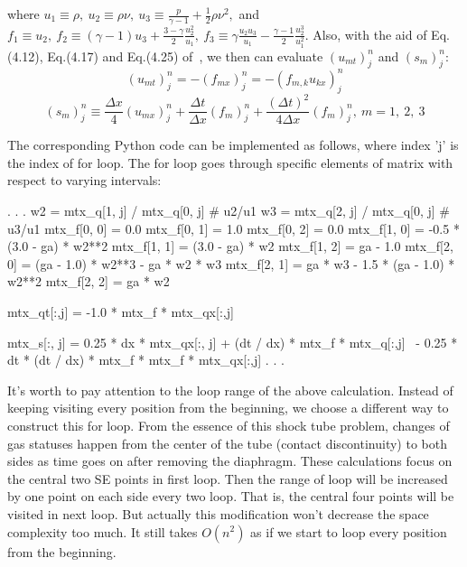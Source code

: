 \documentclass[a4paper,12pt,dvips]{article}
\begin{document}
where $u_{1}\equiv\rho,~u_{2}\equiv\rho\nu,~u_{3}\equiv\frac{p}{\gamma -1}
+\frac{1}{2}\rho\nu^{2},$ \newline
and $f_{1}\equiv u_{2},~f_{2}\equiv(\gamma -1)u_{3}+\frac{3-\gamma}{2}
\frac{u^{2}_{2}}{u_{1}},~f_{3}\equiv\gamma\frac{u_{2}u_{3}}{u_{1}}
-\frac{\gamma -1}{2}\frac{u^{3}_{2}}{u^{2}_{1}}$. \newline
Also, with the aid of Eq.(4.12), Eq.(4.17) and Eq.(4.25)
of~\cite{CESE_Shin_Chung_Chang_1995}, we then can evaluate $(u_{mt})^{n}_{j}$
and $(s_{m})^{n}_{j}$:
\begin{equation}
(u_{mt})^{n}_{j} = -(f_{mx})^{n}_{j} = -(f_{m,k}u_{kx})^{n}_{j}
\end{equation}
\begin{equation}
(s_{m})^{n}_{j}\equiv\frac{\Delta x}{4}(u_{mx})^{n}_{j}+\frac{\Delta t}
{\Delta x}(f_{m})^{n}_{j}+\frac{(\Delta t)^{2}}{4\Delta x}(f_{m})^{n}_{j}
,~m=1,~2,~3
\end{equation}

The corresponding Python code can be implemented as follows, where index 'j' is 
the index of for loop. The for loop goes through specific elements of matrix 
with respect to varying intervals:
\begin{pythonNoIndex}
                            .
                            .
                            .
        w2 = mtx_q[1, j] / mtx_q[0, j]  # u2/u1
        w3 = mtx_q[2, j] / mtx_q[0, j]  # u3/u1
        mtx_f[0, 0] = 0.0
        mtx_f[0, 1] = 1.0
        mtx_f[0, 2] = 0.0
        mtx_f[1, 0] = -0.5 * (3.0 - ga) * w2**2
        mtx_f[1, 1] = (3.0 - ga) * w2
        mtx_f[1, 2] = ga - 1.0
        mtx_f[2, 0] = (ga - 1.0) * w2**3 - ga * w2 * w3
        mtx_f[2, 1] = ga * w3 - 1.5 * (ga - 1.0) * w2**2
        mtx_f[2, 2] = ga * w2

        mtx_qt[:,j] = -1.0 * mtx_f * mtx_qx[:,j]

        mtx_s[:, j] = 0.25 * dx * mtx_qx[:, j] + (dt / dx) * mtx_f * mtx_q[:,j] \
                          - 0.25 * dt * (dt / dx) * mtx_f * mtx_f * mtx_qx[:,j]
                            .
                            .
                            .
\end{pythonNoIndex}

It's worth to pay attention to the loop range of the above calculation.
Instead of keeping visiting every position from the beginning, we choose a
different way to construct this for loop. From the essence of this shock tube
problem, changes of gas statuses happen from the center of the tube (contact
discontinuity) to both sides as time goes on after removing the diaphragm.
These calculations focus on the central two SE points in first loop. Then the
range of loop will be increased by one point on each side every two loop. 
That is, the central four points will be visited in next loop. But actually this
modification won't decrease the space complexity too much. It still takes
$O(n^{2})$ as if we start to loop every position from the beginning.
\end{document}
